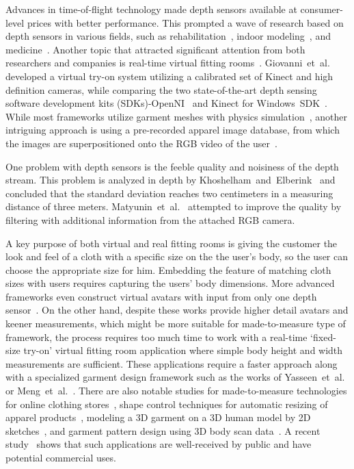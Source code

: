 Advances in time-of-flight technology made depth sensors available at consumer-level prices with better performance. This prompted a wave of research 
based on depth sensors in various fields, such as rehabilitation~\cite{Chang2011}, indoor modeling~\cite{Henry2012}, and medicine~\cite{Gallo2011}. Another 
topic that attracted significant attention from both researchers and companies is real-time virtual fitting rooms~\cite{Meng2010}. Giovanni~et~al.~\cite{Giovanni2012} 
developed a virtual try-on system utilizing a calibrated set of Kinect and high definition cameras, while comparing the two state-of-the-art depth sensing software 
development kits (SDKs)-OpenNI~\cite{OpenNI2102} and Kinect for Windows~SDK~\cite{Microsoft2013}. While most frameworks utilize garment meshes with physics 
simulation~\cite{Fitnect2012,Styku2013}, another intriguing approach is using a pre-recorded apparel image database, from which the images are superpositioned onto the
RGB video of the user~\cite{Hauswiesner2013,Zhou2012}.  

One problem with depth sensors is the feeble quality and noisiness of the depth stream. This problem is analyzed in depth by Khoshelham~and~Elberink~\cite{Khoshelham2012}
 and concluded that the standard deviation reaches two centimeters in a measuring distance of three meters. Matyunin~et~al.~\cite{Matyunin2011} attempted to improve the 
 quality by filtering with additional information from the attached RGB camera.  

A key purpose of both virtual and real fitting rooms is giving the customer the look and feel of a cloth with a specific size on the the user's body, so the user can choose
the appropriate size for him. Embedding the feature of matching cloth sizes with users requires capturing the users' body dimensions. More advanced frameworks even construct
virtual avatars with input from only one depth sensor~\cite{Cui2013,Cui2010}. On the other hand, despite these works provide higher detail avatars and keener measurements,
which might be more suitable for made-to-measure type of framework, the process requires too much time to work with a real-time `fixed-size try-on' virtual fitting room application
where simple body height and width measurements are sufficient. These applications require a faster approach along with a specialized garment design framework such as the works of 
Yasseen~et~al.~\cite{Yasseen2013} or Meng~et~al.~\cite{Meng2010}. There are also notable studies for made-to-measure technologies for online clothing stores~\cite{Cordier2003},
shape control techniques for automatic resizing of apparel products~\cite{Meng2012}, modeling a 3D garment on a 3D human model by 2D sketches~\cite{Wang2003}, and garment pattern
design using 3D body scan data~\cite{Kim2003}. A recent study~\cite{Kim2013} shows that such applications are well-received by public and have potential commercial uses.     
